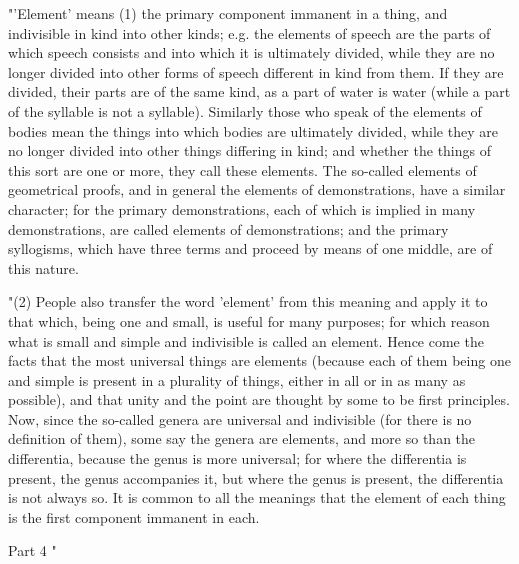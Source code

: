 "'Element' means (1) the primary component immanent in a thing, and
indivisible in kind into other kinds; e.g. the elements of speech
are the parts of which speech consists and into which it is ultimately
divided, while they are no longer divided into other forms of speech
different in kind from them. If they are divided, their parts are
of the same kind, as a part of water is water (while a part of the
syllable is not a syllable). Similarly those who speak of the elements
of bodies mean the things into which bodies are ultimately divided,
while they are no longer divided into other things differing in kind;
and whether the things of this sort are one or more, they call these
elements. The so-called elements of geometrical proofs, and in general
the elements of demonstrations, have a similar character; for the
primary demonstrations, each of which is implied in many demonstrations,
are called elements of demonstrations; and the primary syllogisms,
which have three terms and proceed by means of one middle, are of
this nature. 

"(2) People also transfer the word 'element' from this meaning and
apply it to that which, being one and small, is useful for many purposes;
for which reason what is small and simple and indivisible is called
an element. Hence come the facts that the most universal things are
elements (because each of them being one and simple is present in
a plurality of things, either in all or in as many as possible), and
that unity and the point are thought by some to be first principles.
Now, since the so-called genera are universal and indivisible (for
there is no definition of them), some say the genera are elements,
and more so than the differentia, because the genus is more universal;
for where the differentia is present, the genus accompanies it, but
where the genus is present, the differentia is not always so. It is
common to all the meanings that the element of each thing is the first
component immanent in each. 

Part 4 "

